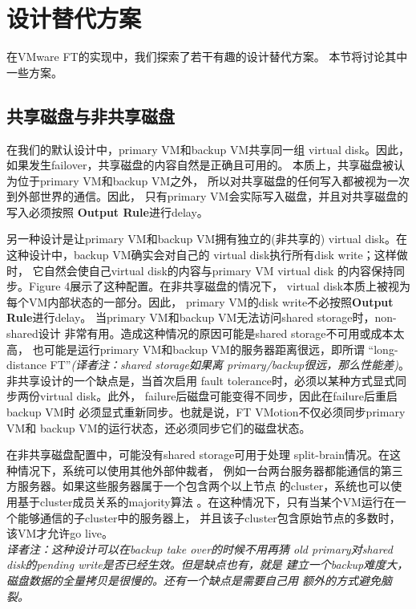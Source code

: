 \section{设计替代方案}

在VMware FT的实现中，我们探索了若干有趣的设计替代方案。%
本节将讨论其中一些方案。

\subsection{共享磁盘与非共享磁盘}

\insertfigurefour

在我们的默认设计中，primary VM和backup VM共享同一组%
virtual disk。因此，如果发生failover，共享磁盘的内容自然是正确且可用的。%
本质上，共享磁盘被认为位于primary VM和backup VM之外，%
所以对共享磁盘的任何写入都被视为一次到外部世界的通信。因此，%
只有primary VM会实际写入磁盘，并且对共享磁盘的写入必须按照%
\textbf{Output Rule}进行delay。%

另一种设计是让primary VM和backup VM拥有独立的(非共享的)%
virtual disk。在这种设计中，backup VM确实会对自己的%
virtual disk执行所有disk write；这样做时，%
它自然会使自己virtual disk的内容与primary VM virtual disk%
的内容保持同步。Figure 4展示了这种配置。在非共享磁盘的情况下，%
virtual disk本质上被视为每个VM内部状态的一部分。因此，%
primary VM的disk write不必按照\textbf{Output Rule}进行delay。%
当primary VM和backup VM无法访问shared storage时，non-shared设计%
非常有用。造成这种情况的原因可能是shared storage不可用或成本太高，%
也可能是运行primary VM和backup VM的服务器距离很远，即所谓%
“long-distance FT”\emph{(译者注：shared storage如果离%
primary/backup很远，那么性能差)}。非共享设计的一个缺点是，当首次启用%
fault tolerance时，必须以某种方式显式同步两份virtual disk。此外，%
failure后磁盘可能变得不同步，因此在failure后重启backup VM时%
必须显式重新同步。也就是说，FT VMotion不仅必须同步primary VM和%
backup VM的运行状态，还必须同步它们的磁盘状态。%

在非共享磁盘配置中，可能没有shared storage可用于处理%
split-brain情况。在这种情况下，系统可以使用其他外部仲裁者，%
例如一台两台服务器都能通信的第三方服务器。如果这些服务器属于一个包含两个以上节点%
的cluster，系统也可以使用基于cluster成员关系的majority算法%
。在这种情况下，只有当某个VM运行在一个能够通信的子cluster中的服务器上，%
并且该子cluster包含原始节点的多数时，该VM才允许go live。
\\\emph{译者注：这种设计可以在backup take over的时候不用再猜%
old primary对shared disk的pending write是否已经生效。但是缺点也有，就是%
建立一个backup难度大，磁盘数据的全量拷贝是很慢的。还有一个缺点是需要自己用%
额外的方式避免脑裂。}%

